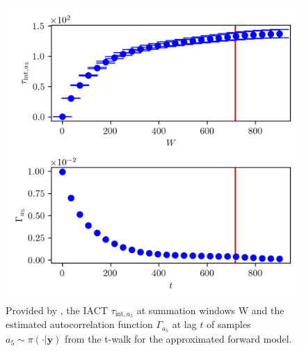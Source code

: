 \begin{figure}[ht!]
	\centering
	\includegraphics{UwerrTauIntTWalk15.png}
	\caption[IACT and autocorrelation function of samples $a_5 \sim \pi(\cdot|\bm{y})$, for approximated model.]{Provided by \cite{drikHesse}, the IACT $\tau_{\text{int},a_5}$ at summation windows W and the estimated autocorrelation function $\Gamma_{a_5}$ at lag $t$ of samples $a_5 \sim \pi(\cdot| \bm{y})$ from the t-walk for the approximated forward model.}
	\label{fig:TWalkIATC16}
\end{figure}
